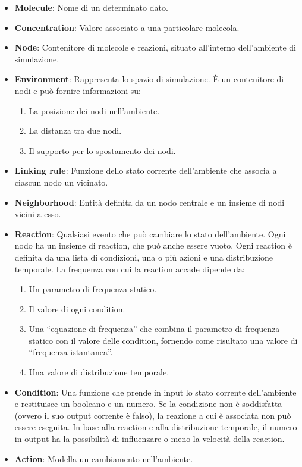 \begin{itemize}
	\item \textbf{Molecule}:  Nome di un determinato dato.
	\item \textbf{Concentration}:  Valore associato a una particolare molecola. 
	\item \textbf{Node}: Contenitore di molecole e reazioni, situato all'interno dell'ambiente di simulazione.
	\item \textbf{Environment}: Rappresenta lo spazio di simulazione. È un contenitore di nodi e può fornire informazioni su:
	\begin{enumerate}
		\item La posizione dei nodi nell'ambiente.
		\item La distanza tra due nodi.
		\item Il supporto per lo spostamento dei nodi.
	\end{enumerate}
	\item \textbf{Linking rule}: Funzione dello stato corrente dell'ambiente che associa a ciascun nodo un vicinato.
	\item \textbf{Neighborhood}: Entità definita da un nodo centrale e un insieme di nodi vicini a esso.
	\item \textbf{Reaction}: Qualsiasi evento che può cambiare lo stato dell'ambiente. Ogni nodo ha un insieme di reaction, che può anche essere vuoto. Ogni reaction è definita da una lista di condizioni, una o più azioni e una distribuzione temporale. La frequenza con cui la reaction accade dipende da:
		\begin{enumerate}
		\item Un parametro di frequenza statico.
		\item Il valore di ogni condition.
		\item Una ``equazione di frequenza'' che combina il parametro di frequenza statico con il valore delle condition, fornendo come risultato una valore di ``frequenza istantanea''.
		\item Una valore di distribuzione temporale.
	\end{enumerate}
	\item \textbf{Condition}: Una funzione che prende in input lo stato corrente dell'ambiente e restituisce un booleano e un numero. Se la condizione non è soddisfatta (ovvero il suo output corrente è falso), la reazione a cui è associata non può essere eseguita. In base alla reaction e alla distribuzione temporale, il numero in output ha la possibilità di influenzare o meno la velocità della reaction.
	\item \textbf{Action}: Modella un cambiamento nell'ambiente.
\end{itemize}

